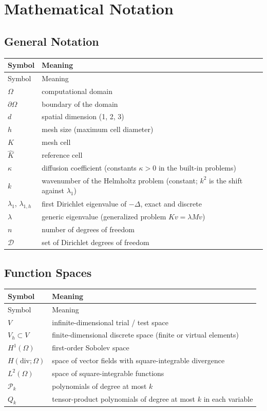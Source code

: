 \documentclass[11pt,oneside]{book}
\theoremstyle{definition}
\theoremstyle{plain}
\begin{document}
\chapter{Mathematical Notation}
\label{app:notation}

\section{General Notation}

\begin{longtable}{@{}ll@{}}
\toprule
Symbol & Meaning \\
\midrule
\endfirsthead
\toprule
Symbol & Meaning \\
\midrule
\endhead
$\Omega$ & computational domain \\
$\partial\Omega$ & boundary of the domain \\
$d$ & spatial dimension (1, 2, 3) \\
$h$ & mesh size (maximum cell diameter) \\
$K$ & mesh cell \\
$\hat K$ & reference cell \\
$\kappa$ & diffusion coefficient (constants $\kappa>0$ in the built-in problems) \\
$k$ & wavenumber of the Helmholtz problem (constant; $k^2$ is the shift against $\lambda_1$) \\
$\lambda_1$, $\lambda_{1,h}$ & first Dirichlet eigenvalue of $-\Delta$, exact and discrete \\
$\lambda$ & generic eigenvalue (generalized problem $Kv=\lambda Mv$) \\
$n$ & number of degrees of freedom \\
$\mathcal{D}$ & set of Dirichlet degrees of freedom \\
\bottomrule
\end{longtable}

\section{Function Spaces}

\begin{longtable}{@{}ll@{}}
\toprule
Symbol & Meaning \\
\midrule
\endfirsthead
\toprule
Symbol & Meaning \\
\midrule
\endhead
$V$ & infinite-dimensional trial / test space \\
$V_h\subset V$ & finite-dimensional discrete space (finite or virtual elements) \\
$H^1(\Omega)$ & first-order Sobolev space \\
$H(\mathrm{div};\Omega)$ & space of vector fields with square-integrable divergence \\
$L^2(\Omega)$ & space of square-integrable functions \\
$\mathcal{P}_k$ & polynomials of degree at most $k$ \\
$Q_k$ & tensor-product polynomials of degree at most $k$ in each variable \\
\bottomrule
\end{longtable}
\end{document}
